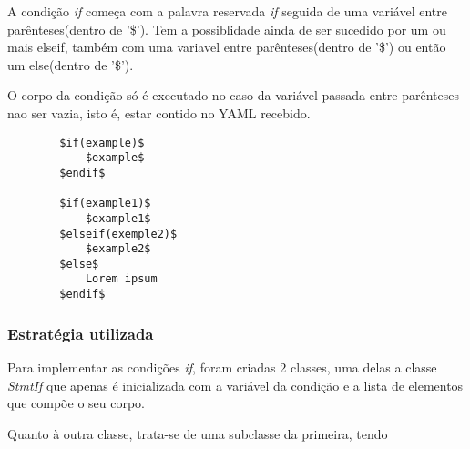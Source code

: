 \documentclass[../relatorio.tex]{subfiles}
\begin{document}
    A condição \textit{if} começa com a palavra reservada \textit{if}
    seguida de uma variável entre parênteses(dentro de '\$'). Tem a
    possiblidade ainda de ser sucedido por um ou mais elseif, também com 
    uma variavel entre parênteses(dentro de '\$') ou então um else(dentro de '\$').
    
    O corpo da condição só é executado no caso da variável passada entre parênteses
    nao ser vazia, isto é, estar contido no YAML recebido.

    \begin{verbatim}
        $if(example)$
            $example$
        $endif$

        $if(example1)$
            $example1$
        $elseif(exemple2)$
            $example2$
        $else$
            Lorem ipsum    
        $endif$
    \end{verbatim}

    \subsubsection{Estratégia utilizada}

    Para implementar as condições \textit{if}, foram criadas 2 classes,
    uma delas a classe \textit{StmtIf} que apenas é inicializada com 
    a variável da condição e a lista de elementos que compõe o seu corpo.

    Quanto à outra classe, trata-se de uma subclasse da primeira, tendo 
    
    
\end{document}

